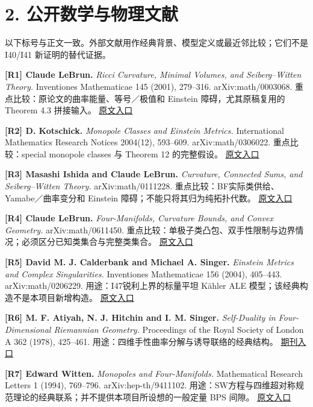 \documentclass[UTF8,a4paper,11pt,fontset=fandol]{ctexart}
\begin{document}
\section{2.
公开数学与物理文献}\label{ux516cux5f00ux6570ux5b66ux4e0eux7269ux7406ux6587ux732e}

以下标号与正文一致。外部文献用作经典背景、模型定义或最近邻比较；它们不是
I40/I41 新证明的替代证据。

\textbf{{[}R1{]} Claude LeBrun.} \emph{Ricci Curvature, Minimal Volumes,
and Seiberg--Witten Theory.} Inventiones Mathematicae 145 (2001),
279--316. arXiv:math/0003068. 重点比较：原论文的曲率能量、等号／极值和
Einstein 障碍，尤其原稿复用的 Theorem 4.3 拼接输入。
\href{https://arxiv.org/abs/math/0003068}{原文入口}

\textbf{{[}R2{]} D. Kotschick.} \emph{Monopole Classes and Einstein
Metrics.} International Mathematics Research Notices 2004(12), 593--609.
arXiv:math/0306022. 重点比较：special monopole classes 与 Theorem 12
的完整假设。 \href{https://arxiv.org/abs/math/0306022}{原文入口}

\textbf{{[}R3{]} Masashi Ishida and Claude LeBrun.} \emph{Curvature,
Connected Sums, and Seiberg--Witten Theory.} arXiv:math/0111228.
重点比较：BF实际类供给、Yamabe／曲率变分和 Einstein
障碍；不能只将其归为纯拓扑代数。
\href{https://arxiv.org/abs/math/0111228}{原文入口}

\textbf{{[}R4{]} Claude LeBrun.} \emph{Four-Manifolds, Curvature Bounds,
and Convex Geometry.} arXiv:math/0611450.
重点比较：单极子类凸包、双手性限制与边界情况；必须区分已知类集合与完整类集合。
\href{https://arxiv.org/abs/math/0611450}{原文入口}

\textbf{{[}R5{]} David M. J. Calderbank and Michael A. Singer.}
\emph{Einstein Metrics and Complex Singularities.} Inventiones
Mathematicae 156 (2004), 405--443. arXiv:math/0206229.
用途：I47锐利上界的标量平坦 Kähler ALE
模型；该经典构造不是本项目新增构造。
\href{https://arxiv.org/abs/math/0206229}{原文入口}

\textbf{{[}R6{]} M. F. Atiyah, N. J. Hitchin and I. M. Singer.}
\emph{Self-Duality in Four-Dimensional Riemannian Geometry.} Proceedings
of the Royal Society of London A 362 (1978), 425--461.
用途：四维手性曲率分解与诱导联络的经典结构。
\href{https://royalsocietypublishing.org/rspa/article/362/1711/425/14679/Self-duality-in-four-dimensional-Riemannian}{期刊入口}

\textbf{{[}R7{]} Edward Witten.} \emph{Monopoles and Four-Manifolds.}
Mathematical Research Letters 1 (1994), 769--796. arXiv:hep-th/9411102.
用途：SW方程与四维超对称规范理论的经典联系；并不提供本项目所设想的一般定量
BPS 间隙。 \href{https://arxiv.org/abs/hep-th/9411102}{原文入口}
\end{document}
